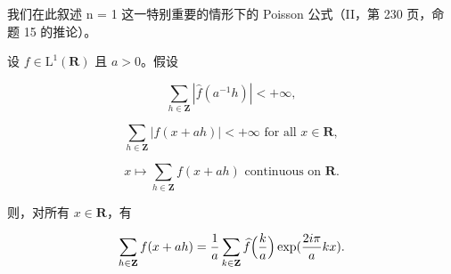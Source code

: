 
我们在此叙述 n = 1 这一特别重要的情形下的 Poisson 公式（II，第 230 页，命题 15 的推论）。

设 \(f\in \mathrm{L}^1 (\mathbf{R})\) 且 \(a > 0\)。假设

\[
\sum_ {h \in \mathbf {Z}} | \widehat {f} (a ^ {- 1} h) | <   + \infty ,
\]

\[
\sum_ {h \in \mathbf {Z}} | f (x + a h) | <   + \infty \text {   for all   } x \in \mathbf {R},
\]

\[
x \mapsto \sum_ {h \in \mathbf {Z}} f (x + a h) \text {   continuous   on   } \mathbf {R}.
\]

则，对所有 \(x \in \mathbf{R}\)，有

\[
\sum_ {h \in {\bf Z}} f (x + a h) = \frac {1}{a} \sum_ {k \in {\bf Z}} \widehat {f} \Bigl (\frac {k}{a} \Bigr) \exp (\frac {2 i \pi}{a} k x).
\]

